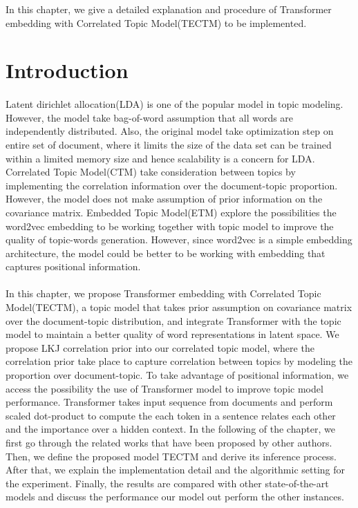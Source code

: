 In this chapter, we give a detailed explanation and procedure of Transformer embedding with Correlated Topic Model(TECTM) to be implemented.
\section{Introduction}
\paragraph{}Latent dirichlet allocation(LDA)\cite{blei_latent_2003} is one of the popular model in topic modeling. However, the model take bag-of-word assumption that all words are independently distributed. Also, the original model take optimization step on entire set of document, where it limits the size of the data set can be trained within a limited memory size and hence scalability is a concern for LDA.
Correlated Topic Model(CTM)\cite{blei_correlated_2007} take consideration between topics by implementing the correlation information over the document-topic proportion. However, the model does not make assumption of prior information on the covariance matrix.
Embedded Topic Model(ETM)\cite{dieng_topic_2020} explore the possibilities the word2vec embedding to be working together with topic model to improve the quality of topic-words generation. However, since word2vec is a simple embedding architecture, the model could be better to be working with embedding that captures positional information.
\paragraph{}In this chapter, we propose Transformer embedding with Correlated Topic Model(TECTM), a topic model that takes prior assumption on covariance matrix over the document-topic distribution, and integrate Transformer with the topic model to maintain a better quality of word representations in latent space.
We propose LKJ correlation prior into our correlated topic model, where the correlation prior take place to capture correlation between topics by modeling the proportion over document-topic.
To take advantage of positional information, we access the possibility the use of Transformer model to improve topic model performance. Transformer takes input sequence from documents and perform scaled dot-product to compute the each token in a sentence relates each other and the importance over a hidden context.
In the following of the chapter, we first go through the related works that have been proposed by other authors. Then, we define the proposed model TECTM and derive its inference process. After that, we explain the implementation detail and the algorithmic setting for the experiment. Finally, the results are compared with other state-of-the-art models and discuss the performance our model out perform the other instances.
